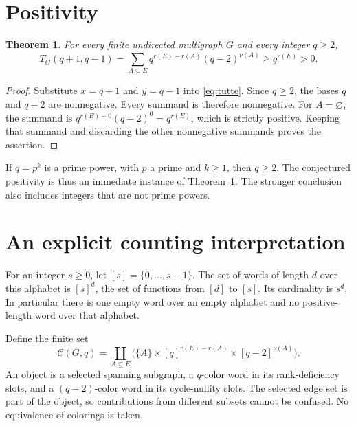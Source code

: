 \documentclass[11pt]{article}
\newtheorem{theorem}{Theorem}
\begin{document}
\newpage
\section{Positivity}
\begin{theorem}\label{thm:positive}
For every finite undirected multigraph $G$ and every integer $q\ge2$,
\[
 T_G(q+1,q-1)=\sum_{A\subseteq E}
 q^{r(E)-r(A)}(q-2)^{\nu(A)}\ge q^{r(E)}>0.
\]
\end{theorem}
\begin{proof}
Substitute $x=q+1$ and $y=q-1$ into \eqref{eq:tutte}. Since $q\ge2$, the
bases $q$ and $q-2$ are nonnegative. Every summand is therefore nonnegative.
For $A=\varnothing$, the summand is
$q^{r(E)-0}(q-2)^0=q^{r(E)}$, which is strictly positive. Keeping that
summand and discarding the other nonnegative summands proves the assertion.
\end{proof}
If $q=p^k$ is a prime power, with $p$ a prime and $k\ge1$, then $q\ge2$.
The conjectured positivity is thus an immediate instance of
Theorem~\ref{thm:positive}. The stronger conclusion also includes integers
that are not prime powers.

\section{An explicit counting interpretation}
For an integer $s\ge0$, let $[s]=\{0,\ldots,s-1\}$. The set of words of
length $d$ over this alphabet is $[s]^d$, the set of functions from $[d]$ to
$[s]$. Its cardinality is $s^d$. In particular there is one empty word over
an empty alphabet and no positive-length word over that alphabet.

Define the finite set
\begin{equation}\label{eq:objects}
 \mathcal C(G,q)=\coprod_{A\subseteq E}
 \bigl(\{A\}\times[q]^{r(E)-r(A)}\times[q-2]^{\nu(A)}\bigr).
\end{equation}
An object is a selected spanning subgraph, a $q$-color word in its
rank-deficiency slots, and a $(q-2)$-color word in its cycle-nullity slots.
The selected edge set is part of the object, so contributions from different
subsets cannot be confused. No equivalence of colorings is taken.
\end{document}
